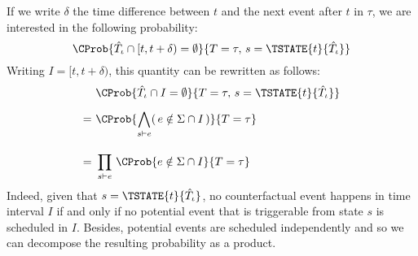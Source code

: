 If we write $\delta$ the time difference between $t$ and the next event after $t$ in $\tau$,
we are interested in the following probability:
\begin{equation}
\CProb{ \hat T_\iota \cap [t, t+\delta) = \emptyset  }
{ T=\tau,\, s = \TSTATE{t}{\hat T_\iota} }
\end{equation}
Writing $I = [t, t+\delta)$, this quantity can be rewritten as follows:
\begin{align}
\ & \ \CProb{ \hat T_\iota \cap I = \emptyset }
{ T=\tau,\, s = \TSTATE{t}{\hat T_\iota} } \\[0.5em]
= & \ \CProb{ \bigwedge_{s \vdash e} (\,e \notin \Sigma \cap I \,)  }{ T=\tau } \\[1em]
= & \ \prod_{s \vdash e}\, \CProb{e \notin \Sigma \cap I }{ T=\tau }
\end{align}
Indeed, given that $s = \TSTATE{t}{\hat T_\iota}$, 
no counterfactual event happens in time interval $I$
if and only if no potential event that is triggerable from state $s$ is scheduled in $I$. 
Besides, potential events are scheduled independently and so we can
decompose the resulting probability as a product.

